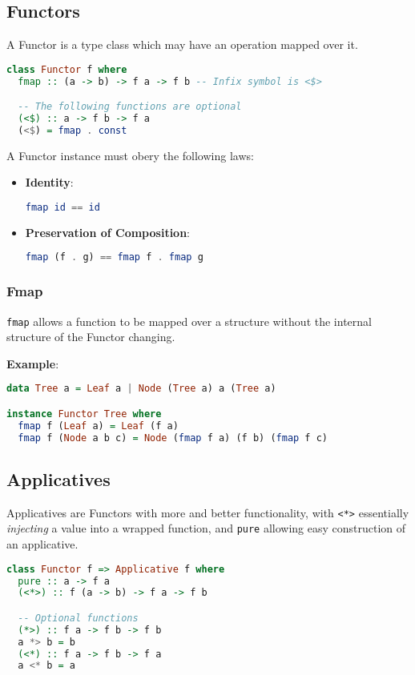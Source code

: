 \subsection{Functors}
A Functor is a type class which may have an operation mapped over it.

\begin{lstlisting}[language=haskell]
class Functor f where
  fmap :: (a -> b) -> f a -> f b -- Infix symbol is <$>

  -- The following functions are optional
  (<$) :: a -> f b -> f a
  (<$) = fmap . const
\end{lstlisting}

A Functor instance must obery the following laws:
\begin{itemize}
  \item \textbf{Identity}: \begin{lstlisting}[language=haskell]
fmap id == id\end{lstlisting}
  \item \textbf{Preservation of Composition}: \begin{lstlisting}[language=haskell]
fmap (f . g) == fmap f . fmap g\end{lstlisting}
\end{itemize}

\subsubsection{Fmap}
\texttt{fmap} allows a function to be mapped over a structure without the internal structure of the Functor changing.

\textbf{Example}:
\begin{lstlisting}[language=haskell]
data Tree a = Leaf a | Node (Tree a) a (Tree a)

instance Functor Tree where
  fmap f (Leaf a) = Leaf (f a)
  fmap f (Node a b c) = Node (fmap f a) (f b) (fmap f c)
\end{lstlisting}

\subsection{Applicatives}
Applicatives are Functors with more and better functionality, with \texttt{<*>} essentially \textit{injecting} a value into a wrapped function, and \texttt{pure} allowing easy construction of an applicative.

\begin{lstlisting}[language=haskell]
class Functor f => Applicative f where
  pure :: a -> f a
  (<*>) :: f (a -> b) -> f a -> f b

  -- Optional functions
  (*>) :: f a -> f b -> f b
  a *> b = b
  (<*) :: f a -> f b -> f a
  a <* b = a
\end{lstlisting}


